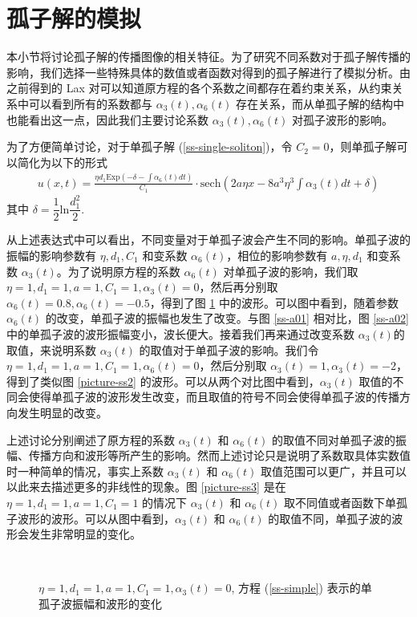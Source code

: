 
\section{孤子解的模拟}
本小节将讨论孤子解的传播图像的相关特征。为了研究不同系数对于孤子解传播的影响，我们选择一些特殊具体的数值或者函数对得到的孤子解进行了模拟分析。由之前得到的 Lax 对可以知道原方程的各个系数之间都存在着约束关系，从约束关系中可以看到所有的系数都与 $\alpha_3(t), \alpha_6(t)$ 存在关系，而从单孤子解的结构中也能看出这一点，因此我们主要讨论系数 $\alpha_3(t),\alpha_6(t)$ 对孤子波形的影响。

为了方便简单讨论，对于单孤子解 (\ref{ss-single-soliton})，令 $C_2 = 0$，则单孤子解可以简化为以下的形式
\begin{align}
    u(x, t) = \frac{\eta d_1 \mathrm{Exp}\left(-\delta - \int \alpha_6(t)dt\right)}{C_1}\cdot \mathrm{sech}\left(2a\eta x - 8a^3\eta^3 \int \alpha_3(t)dt + \delta\right)  \label{ss-simple}
\end{align}
其中 $\delta = \dfrac{1}{2}\mathrm{ln}\dfrac{d_1^2}{2}$.

从上述表达式中可以看出，不同变量对于单孤子波会产生不同的影响。单孤子波的振幅的影响参数有 $\eta, d_1, C_1$ 和变系数 $\alpha_6(t)$，相位的影响参数有 $a, \eta, d_1$ 和变系数 $\alpha_3(t)$。为了说明原方程的系数 $\alpha_6(t)$ 对单孤子波的影响，我们取 $\eta = 1, d_1 = 1, a = 1, C_1 = 1, \alpha_3(t) = 0$，然后再分别取 $\alpha_6(t) = 0.8, \alpha_6(t) = -0.5$，得到了图 \ref{picture-ss1} 中的波形。可以图中看到，随着参数 $\alpha_6(t)$ 的改变，单孤子波的振幅也发生了改变。与图 \ref{ss-a01} 相对比，图 \ref{ss-a02} 中的单孤子波的波形振幅变小，波长便大。接着我们再来通过改变系数 $\alpha_3(t)$的取值，来说明系数 $\alpha_3(t)$ 的取值对于单孤子波的影响。我们令 $\eta = 1, d_1 = 1, a = 1, C_1 = 1, \alpha_6(t) = 0$，然后分别取 $\alpha_3(t) = 1, \alpha_3(t) = -2$，得到了类似图 \ref{picture-ss2} 的波形。可以从两个对比图中看到，$\alpha_3(t)$ 取值的不同会使得单孤子波的波形发生改变，而且取值的符号不同会使得单孤子波的传播方向发生明显的改变。

上述讨论分别阐述了原方程的系数 $\alpha_3(t)$ 和 $\alpha_6(t)$ 的取值不同对单孤子波的振幅、传播方向和波形等所产生的影响。然而上述讨论只是说明了系数取具体实数值时一种简单的情况，事实上系数 $\alpha_3(t)$ 和 $\alpha_6(t)$ 取值范围可以更广，并且可以以此来去描述更多的非线性的现象。图 \ref{picture-ss3} 是在 $\eta = 1, d_1 = 1, a = 1, C_1 = 1$ 的情况下 $\alpha_3(t)$ 和 $\alpha_6(t)$ 取不同值或者函数下单孤子波形的波形。可以从图中看到，$\alpha_3(t)$ 和 $\alpha_6(t)$ 的取值不同，单孤子波的波形会发生非常明显的变化。
\begin{figure}[!htp]
	\centering
	\ \
	\caption{$\eta = 1, d_1 = 1, a = 1, C_1 = 1, \alpha_3(t) = 0$, 方程 (\ref{ss-simple}) 表示的单孤子波振幅和波形的变化}
	\label{picture-ss1}
\end{figure}

